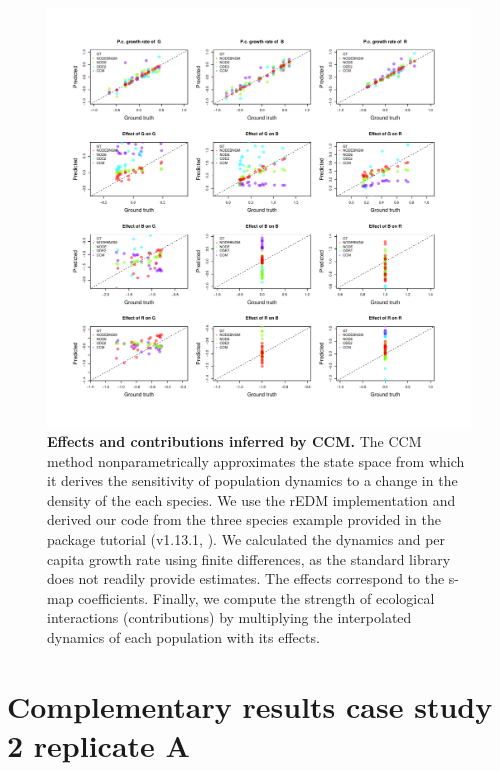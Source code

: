 \documentclass[11pt, oneside]{article}
\begin{document}
\begin{figure}[H]
\includegraphics[width=1\linewidth,page=5]{figures/figures_supplementary.pdf}
\caption{
    \textbf{Effects and contributions inferred by CCM.}
    The CCM method nonparametrically approximates the state space from which it derives the sensitivity of population dynamics to a change in the density of the each species.
    We use the rEDM implementation and derived our code from the three species example provided in the package tutorial (v1.13.1, \cite{Sugihara2012}).
    We calculated the dynamics and per capita growth rate using finite differences, as the standard library does not readily provide estimates.
    The effects correspond to the s-map coefficients.
    Finally, we compute the strength of ecological interactions (contributions) by multiplying the interpolated dynamics of each population with its effects.
}
\end{figure}
\newpage


\newpage
\section{Complementary results case study 2 replicate A}
\end{document}
